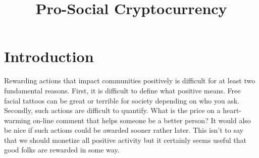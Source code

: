 \documentclass[12pt]{article}
\title{Pro-Social Cryptocurrency}
\date{}
\newenvironment{sciabstract}{%
\begin{quote} \bf}
{\end{quote}}
\begin{document}
 


\baselineskip24pt


\maketitle 






\section*{Introduction}

Rewarding actions that impact communities positively is difficult for at least two fundamental reasons. First, it is difficult to define what positive means. Free facial tattoos can be great or terrible for society depending on who you ask. Secondly, such actions are difficult to quantify. What is the price on a heart-warming on-line comment that helps someone be a better person? It would also be nice if such actions could be awarded sooner rather later. This isn't to say that we should monetize all positive activity but it certainly seems useful that good folks are rewarded in some way.
\end{document}
